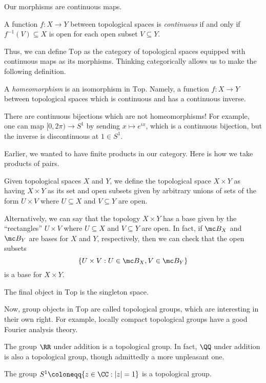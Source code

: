 \documentclass[../notes.tex]{subfiles}
\begin{document}
Our morphisms are continuous maps.
\begin{definition}[continuous]
	A function $f\colon X\to Y$ between topological spaces is \textit{continuous} if and only if $f^{-1}(V)\subseteq X$ is open for each open subset $V\subseteq Y$.
\end{definition}
Thus, we can define $\mathrm{Top}$ as the category of topological spaces equipped with continuous maps as its morphisms. Thinking categorically allows us to make the following definition.
\begin{definition}[homeomorphism]
	A \textit{homeomorphism} is an isomorphism in $\mathrm{Top}$. Namely, a function $f\colon X\to Y$ between topological spaces which is continuous and has a continuous inverse.
\end{definition}
\begin{remark}
	There are continuous bijections which are not homeomorphisms! For example, one can map $[0,2\pi)\to S^1$ by sending $x\mapsto e^{ix}$, which is a continuous bijection, but the inverse is discontinuous at $1\in S^1$.
\end{remark}

Earlier, we wanted to have finite products in our category. Here is how we take products of pairs.
\begin{definition}
	Given topological spaces $X$ and $Y$, we define the topological space $X\times Y$ as having $X\times Y$ as its set and open subsets given by arbitrary unions of sets of the form $U\times V$ where $U\subseteq X$ and $V\subseteq Y$ are open.
\end{definition}
\begin{remark}
	Alternatively, we can say that the topology $X\times Y$ has a base given by the ``rectangles'' $U\times V$ where $U\subseteq X$ and $V\subseteq Y$ are open. In fact, if $\mc B_X$ and $\mc B_Y$ are bases for $X$ and $Y$, respectively, then we can check that the open subsets
	\[\{U\times V:U\in\mc B_X,V\in\mc B_Y\}\]
	is a base for $X\times Y$.
\end{remark}
\begin{remark}
	The final object in $\mathrm{Top}$ is the singleton space.
\end{remark}
Now, group objects in $\mathrm{Top}$ are called topological groups, which are interesting in their own right. For example, locally compact topological groups have a good Fourier analysis theory.
\begin{example}
	The group $\RR$ under addition is a topological group. In fact, $\QQ$ under addition is also a topological group, though admittedly a more unpleasant one.
\end{example}
\begin{example}
	The group $S^1\coloneqq\{z\in\CC:\left|z\right|=1\}$ is a topological group.
\end{example}
\end{document}
